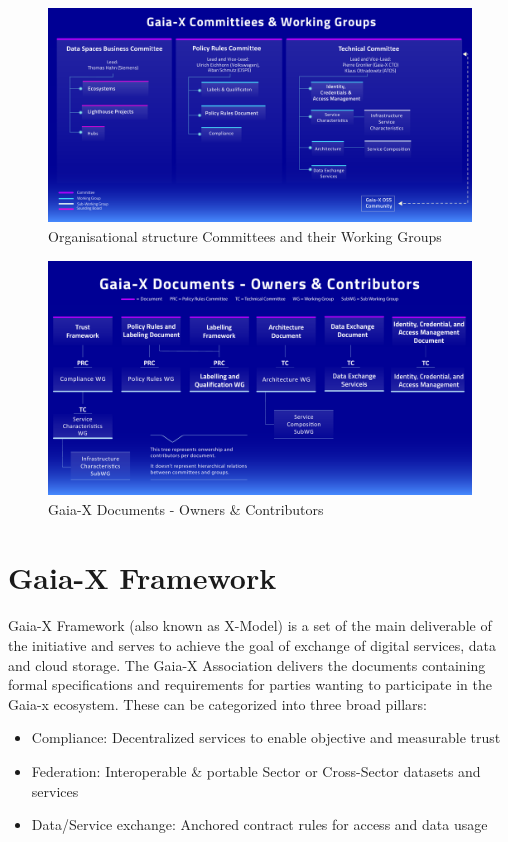 \begin{figure}
    \centering
    \includegraphics[width=\textwidth]{figures/committees-and-working-groups.pdf}
    \caption{Organisational structure Committees and their Working Groups~\cite{gaiax}}\label{fig:organisational-committees-structure}
\end{figure}

\begin{figure}
    \centering
    \includegraphics[width=\textwidth]{figures/committees-owners-and-contributors.pdf}
    \caption{Gaia-X Documents - Owners \& Contributors~\cite{gaiax}}\label{fig:gaiax-documents-owners-and-contributors}
\end{figure}

\section{Gaia-X Framework}\label{sec:gaia-x-framework}

Gaia-X Framework (also known as X-Model) is a set of the main deliverable of the initiative and serves to achieve the goal of exchange of digital services, data and cloud storage.
The Gaia-X Association delivers the documents containing formal specifications and requirements for parties wanting to participate in the Gaia-x ecosystem.
These can be categorized into three broad pillars:
\begin{itemize}
    \item Compliance: Decentralized services to enable objective and measurable trust
    \item Federation: Interoperable \& portable Sector or Cross-Sector datasets and services
    \item Data/Service exchange: Anchored contract rules for access and data usage
\end{itemize}

